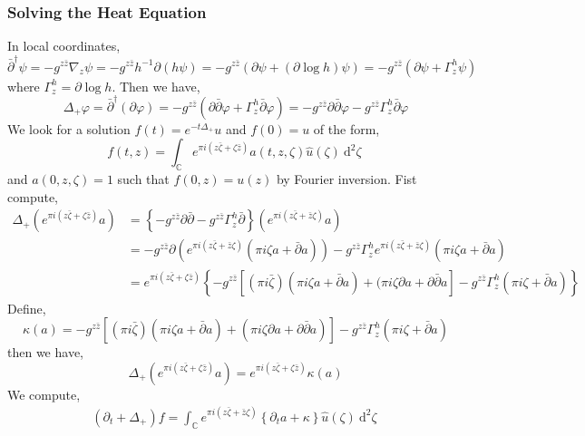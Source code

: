 \documentclass[12pt]{extarticle}
\newcommand{\C}{\mathbb{C}}
\newcommand{\dn}[2]{\: \mathrm{d}^{#1} #2 \:}
\theoremstyle{definition}
\begin{document}
\subsubsection{Solving the Heat Equation}

In local coordinates, 
\[ \bar{\partial}^\dagger \psi = - g^{z \bar{z}} \nabla_z \psi = - g^{z \bar{z}} h^{-1} \partial (h \psi) = - g^{z \bar{z}} ( \partial \psi + (\partial \log{h}) \psi) = - g^{z \bar{z}} \left( \partial \psi + \Gamma^h_{z} \psi \right) \]
where $\Gamma^h_z = \partial \log{h}$. Then we have,
\[ \Delta_{+} \varphi = \bar{\partial}^\dagger (\partial \varphi) = - g^{z \bar{z}} \left( \partial \bar{\partial} \varphi + \Gamma^h_z \bar{\partial} \varphi \right) = - g^{z \bar{z}} \partial \bar{\partial} \varphi - g^{z \bar{z}} \Gamma^h_z \bar{\partial} \varphi \]
We look for a solution $f(t) = e^{- t \Delta_{+}} u$ and $f(0) = u$ of the form,
\[ f(t, z) = \int_{\C} e^{\pi i (z \bar{\zeta} + \zeta \bar{z})} a(t, z, \zeta) \hat{u}(\zeta) \dn{2}{\zeta} \]
and $a(0, z, \zeta) = 1$ such that $f(0, z) = u(z)$ by Fourier inversion. Fist compute,
\begin{align*}
\Delta_{+}  \left( e^{\pi i (z \bar{\zeta} + \zeta \bar{z})} a \right) & = \left\{ - g^{z \bar{z}} \partial \bar{\partial} - g^{z \bar{z}} \Gamma^h_z \bar{\partial} \right\} \left( e^{\pi i (z \bar{\zeta} + \bar{z} \zeta)} a \right)
\\
& = - g^{z \bar{z}} \partial \left( e^{\pi i (z \bar{\zeta} + \bar{z} \zeta)} (\pi i \zeta a + \bar{\partial} a) \right) - g^{z \bar{z}} \Gamma^h_z e^{\pi i (z \bar{\zeta} + \bar{z} \zeta)} \left( \pi i \zeta a  + \bar{\partial} a \right) 
\\
& = e^{\pi i (z \bar{\zeta} + \zeta \bar{z})} \left\{ - g^{z \bar{z}} \left[ ( \pi i \bar{\zeta}) ( \pi i \zeta a + \bar{\partial} a) + (\pi i \zeta \partial a + \partial \bar{\partial} a \right] - g^{z \bar{z}} \Gamma^h_z \left( \pi i \zeta + \bar{\partial} a \right) \right\} 
\end{align*}
Define,
\[ \kappa(a) = - g^{z \bar{z}} \left[ ( \pi i \bar{\zeta}) ( \pi i \zeta a + \bar{\partial} a) + (\pi i \zeta \partial a + \partial \bar{\partial} a) \right] - g^{z \bar{z}} \Gamma^h_z \left( \pi i \zeta + \bar{\partial} a \right) \]
then we have,
\[ \Delta_{+}  \left( e^{\pi i (z \bar{\zeta} + \zeta \bar{z})} a \right) = e^{\pi i (z \bar{\zeta} + \zeta \bar{z})} \kappa(a) \]
We compute,
\begin{align*}
(\partial_t + \Delta_{+}) f = \int_{\C} e^{\pi i (z \bar{\zeta} + \bar{z} \zeta)} \left\{ \partial_t a + \kappa \right\} \hat{u}(\zeta) \dn{2}{\zeta}
\end{align*}
\end{document}
